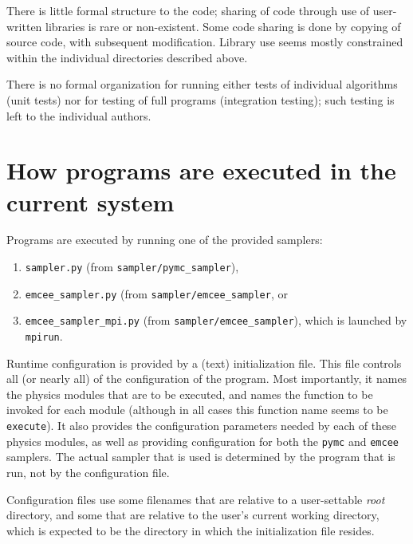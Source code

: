 \documentclass[draftmode,draftwater]{memarticle}
\newcommand{\prog}[1]%
  {\texttt{#1}}
\begin{document}
There is little formal structure to the code; sharing of code through
use of user-written libraries is rare or non-existent. Some code sharing
is done by copying of source code, with subsequent modification. Library
use seems mostly constrained within the individual directories described
above.

There is no formal organization for running either tests of individual
algorithms (unit tests) nor for testing of full programs (integration
testing); such testing is left to the individual authors.

\section{How programs are executed in the current system}

Programs are executed by running one of the provided samplers:
\begin{enumerate}
\item \prog{sampler.py} (from \prog{sampler/pymc\_sampler}),
\item \prog{emcee\_sampler.py} (from \prog{sampler/emcee\_sampler}, or
\item \prog{emcee\_sampler\_mpi.py} (from
  \prog{sampler/emcee\_sampler}), which is launched by \prog{mpirun}.
\end{enumerate}

Runtime configuration is provided by a (text) initialization file. This
file controls all (or nearly all) of the configuration of the program.
Most importantly, it names the physics modules that are to be executed,
and names the function to be invoked for each module (although in all
cases this function name seems to be \texttt{execute}). It also provides
the configuration parameters needed by each of these physics modules, as
well as providing configuration for both the \texttt{pymc} and
\texttt{emcee} samplers. The actual sampler that is used is determined
by the program that is run, not by the configuration file.

Configuration files use some filenames that are relative to a
user-settable \emph{root} directory, and some that are relative to the
user's current working directory, which is expected to be the directory
in which the initialization file resides.



\end{document}

